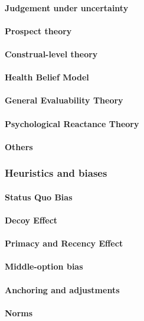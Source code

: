 \paragraph{Judgement under uncertainty}
\paragraph{Prospect theory}
\paragraph{Construal-level theory}
\paragraph{Health Belief Model}
\paragraph{General Evaluability Theory}
\paragraph{Psychological Reactance Theory}
\paragraph{Others}

\subsubsection{Heuristics and biases}
\paragraph{Status Quo Bias}
\paragraph{Decoy Effect}
\paragraph{Primacy and Recency Effect}
\paragraph{Middle-option bias}
\paragraph{Anchoring and adjustments}
\paragraph{Norms}
